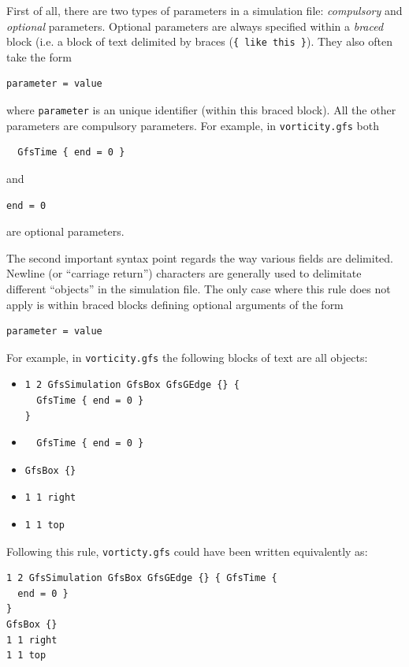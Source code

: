 \documentclass[a4paper]{article}
\begin{document}
First of all, there are two types of parameters in a simulation file:
{\em compulsory} and {\em optional} parameters. Optional parameters
are always specified within a {\em braced} block (i.e. a block of text 
delimited by braces ({\tt \{ like this \}}). They also often take the form
\begin{verbatim}
parameter = value
\end{verbatim}
where {\tt parameter} is an unique identifier (within this braced
block). All the other parameters are compulsory parameters.
For example, in {\tt vorticity.gfs} both
\begin{verbatim}
  GfsTime { end = 0 }
\end{verbatim}
and
\begin{verbatim}
end = 0
\end{verbatim}
are optional parameters.

The second important syntax point regards the way various fields are
delimited. Newline (or ``carriage return'') characters are generally used to
delimitate different ``objects'' in the simulation file. The only
case where this rule does not apply is within braced blocks defining
optional arguments of the form
\begin{verbatim}
parameter = value
\end{verbatim}
For example, in {\tt vorticity.gfs} the following blocks of text are
all objects:
\begin{itemize}
\item
\begin{verbatim}
1 2 GfsSimulation GfsBox GfsGEdge {} {
  GfsTime { end = 0 }
}
\end{verbatim}
\item
\begin{verbatim}
  GfsTime { end = 0 }
\end{verbatim}
\item
\begin{verbatim}
GfsBox {}
\end{verbatim}
\item
\begin{verbatim}
1 1 right
\end{verbatim}
\item
\begin{verbatim}
1 1 top
\end{verbatim}
\end{itemize}
Following this rule, {\tt vorticty.gfs} could have been written
equivalently as:
\begin{verbatim}
1 2 GfsSimulation GfsBox GfsGEdge {} { GfsTime {
  end = 0 }
}
GfsBox {}
1 1 right
1 1 top
\end{verbatim}
\end{document}
